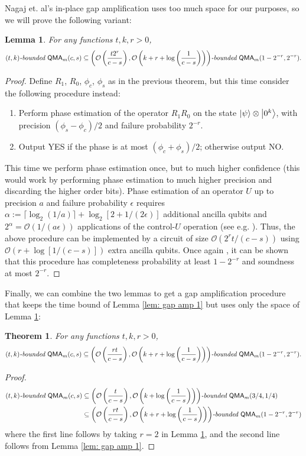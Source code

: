 \documentclass[11pt]{article}
\newtheorem{theorem}{Theorem}
\newtheorem{lemma}{Lemma}
\theoremstyle{definition}
\theoremstyle{remark}
\newcommand\QMA{{\sf{QMA}}}
\newcommand\bddQMA[5]{{\left(#1,#2\right)}\textit{-bounded }\QMA_{#3}(#4,#5)}
\begin{document}
Nagaj et. al's in-place gap amplification uses too much space for our purposes, so we will prove the following variant:
\begin{lemma} \label{lem: gap amp 2}
For any functions $t,k,r>0$, 
\[
\bddQMA{t}{k}{m}{c}{s}\subseteq\bddQMA{\mathcal{O}\left(\frac{t2^r}{c-s}\right)}{\mathcal{O}\left(k+r+\log\left(\frac{1}{c-s}\right)\right)}{m}{1-2^{-r}}{2^{-r}}.
\]
\end{lemma}
\begin{proof}
Define $R_1$, $R_0$, $\phi_c$, $\phi_s$ as in the previous theorem, but this time consider the following procedure instead:
\begin{enumerate}
\item Perform phase estimation of the operator $R_1R_0$ on the state ${\left\vert{\psi}\right\rangle}\otimes {\left\vert{0^k}\right\rangle}$, with precision $(\phi_s - \phi_c)/2$ and failure probability $2^{-r}$.
\item Output YES if the phase is at most $(\phi_{c}+\phi_{s})/2$; otherwise output NO.
\end{enumerate}
This time we perform phase estimation once, but to much higher confidence (this would work by performing phase estimation to much higher precision and discarding the higher order bits). 
Phase estimation of an operator $U$ up to precision $a$ and failure probability $\epsilon$ requires $\alpha := \lceil\log_2(1/a)\rceil + \log_2[2+1/(2\epsilon)]$ additional ancilla qubits and $2^\alpha = \mathcal{O}(1/(a\epsilon))$ applications of the control-$U$ operation (see e.g. \cite{nc00}).  Thus, the above procedure can be implemented by a circuit of size $\mathcal{O}(2^{r}t/(c-s))$ using $\mathcal{O}(r+\log[1/(c-s)])$ extra ancilla qubits. Once again \cite{mw05,nwz11}, it can be shown that this procedure has completeness probability at least $1-2^{-r}$ and soundness at most $2^{-r}$.
\end{proof}

Finally, we can combine the two lemmas to get a gap amplification procedure that keeps the time bound of Lemma \ref{lem: gap amp 1} but uses only the space of Lemma \ref{lem: gap amp 2}:

\begin{theorem} \label{thm: gap amp}
For any functions $t,k,r>0$, 
\[
\bddQMA{t}{k}{m}{c}{s}\subseteq\bddQMA{\mathcal{O}\left(\frac{rt}{c-s}\right)}{\mathcal{O}\left(k+r+\log\left(\frac{1}{c-s}\right)\right)}{m}{1-2^{-r}}{2^{-r}}.
\]
\end{theorem}
\begin{proof}
\begin{align}
\bddQMA{t}{k}{m}{c}{s} &\subseteq \bddQMA{\mathcal{O}\left(\frac{t}{c-s}\right)}{\mathcal{O}\left(k+\log\left(\frac{1}{c-s}\right)\right)}{m}{3/4}{1/4}  \nonumber \\
&\subseteq \bddQMA{\mathcal{O}\left(\frac{rt}{c-s}\right)}{\mathcal{O}\left(k+r+\log\left(\frac{1}{c-s}\right)\right)}{m}{1-2^{-r}}{2^{-r}} \nonumber
\end{align}
where the first line follows by taking $r=2$ in Lemma \ref{lem: gap amp 2}, and the second line follows from Lemma \ref{lem: gap amp 1}.
\end{proof}
\end{document}
